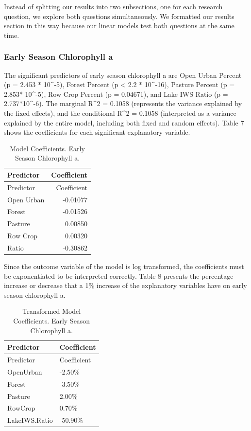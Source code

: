 \documentclass[12pt,]{article}
\begin{document}
Instead of splitting our results into two subsections, one for each
research question, we explore both questions simultaneously. We
formatted our results section in this way because our linear models test
both questions at the same time.

\hypertarget{early-season-chlorophyll-a}{%
\subsubsection{Early Season Chlorophyll
a}\label{early-season-chlorophyll-a}}

The significant predictors of early season chlorophyll a are Open Urban
Percent (p = 2.453 * 10\^{}-5), Forest Percent (p \textless{} 2.2 *
10\^{}-16), Pasture Percent (p = 2.853* 10\^{}-5), Row Crop Percent (p =
0.04671), and Lake IWS Ratio (p = 2.737*10\^{}-6). The marginal R\^{}2 =
0.1058 (represents the variance explained by the fixed effects), and the
conditional R\^{}2 = 0.1058 (interpreted as a variance explained by the
entire model, including both fixed and random effects). Table 7 shows
the coefficients for each significant explanatory variable.

\begin{longtable}[]{@{}lr@{}}
\caption{Model Coefficients. Early Season Chlorophyll a.}\tabularnewline
\toprule
Predictor & Coefficient\tabularnewline
\midrule
\endfirsthead
\toprule
Predictor & Coefficient\tabularnewline
\midrule
\endhead
Open Urban & -0.01077\tabularnewline
Forest & -0.01526\tabularnewline
Pasture & 0.00850\tabularnewline
Row Crop & 0.00320\tabularnewline
Ratio & -0.30862\tabularnewline
\bottomrule
\end{longtable}

Since the outcome variable of the model is log transformed, the
coefficients must be exponentiated to be interpreted correctly. Table 8
presents the percentage increase or decrease that a 1\% increase of the
explanatory variables have on early season chlorophyll a.

\begin{longtable}[]{@{}ll@{}}
\caption{Transformed Model Coefficients. Early Season Chlorophyll
a.}\tabularnewline
\toprule
Predictor & Coefficient\tabularnewline
\midrule
\endfirsthead
\toprule
Predictor & Coefficient\tabularnewline
\midrule
\endhead
OpenUrban & -2.50\%\tabularnewline
Forest & -3.50\%\tabularnewline
Pasture & 2.00\%\tabularnewline
RowCrop & 0.70\%\tabularnewline
LakeIWS.Ratio & -50.90\%\tabularnewline
\bottomrule
\end{longtable}
\end{document}
